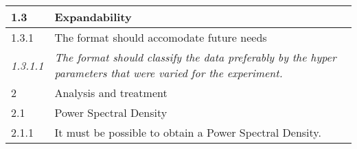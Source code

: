 \begin{tabular}{|p{1cm}|p{14cm}|}
    \rowcolor{graylight} 1.3 & Expandability \\ \hline

    \rowcolor{graysuperlight} 1.3.1 &  The format should accomodate future needs \\ \hline
    \textit{1.3.1.1} & \textit{The format should classify the data preferably by the hyper parameters that were varied for the experiment.} \\ \hline


    \rowcolor{grayheavy} 2 & Analysis and treatment \\ \hline

    \rowcolor{graylight} 2.1 & Power Spectral Density \\ \hline

    \rowcolor{graysuperlight} 2.1.1 &  It must be possible to obtain a Power Spectral Density. \\ \hline
\end{tabular}

